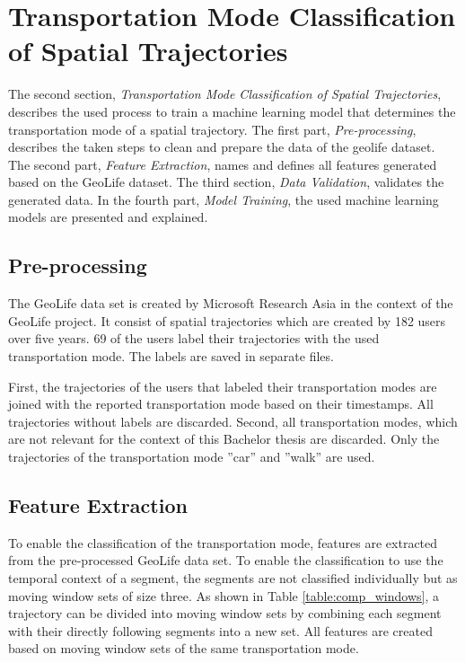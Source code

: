 \section{Transportation Mode Classification of Spatial Trajectories}
The second section, \textit{Transportation Mode Classification of Spatial Trajectories}, describes the used process to train a machine learning model that determines the transportation mode of a spatial trajectory.
The first part, \textit{Pre-processing}, describes the taken steps to clean and prepare the data of the geolife dataset.
The second part, \textit{Feature Extraction}, names and defines all features generated based on the GeoLife dataset.
The third section, \textit{Data Validation}, validates the generated data.
In the fourth part, \textit{Model Training}, the used machine learning models are presented and explained. 

\subsection{Pre-processing}

The GeoLife data set is created by Microsoft Research Asia in the context of the GeoLife project. It consist of spatial trajectories which are created by 182 users over five years. 69 of the users label their trajectories with the used transportation mode. The labels are saved in separate files. \cite{zheng2008understanding} \cite{zheng2010geolife} \cite{geolife-dataset} \cite{zheng2009mining}

First, the trajectories of the users that labeled their transportation modes are joined with the reported transportation mode based on their timestamps. All trajectories without labels are discarded. Second, all transportation modes, which are not relevant for the context of this Bachelor thesis are discarded. Only the trajectories of the transportation mode ''car'' and ''walk'' are used.

\subsection{Feature Extraction}

To enable the classification of the transportation mode, features are extracted from the pre-processed GeoLife data set. To enable the classification to use the temporal context of a segment, the segments are not classified individually but as moving window sets of size three. As shown in Table \ref{table:comp_windows}, a trajectory can be divided into moving window sets by combining each segment with their directly following segments into a new set. All features are created based on moving window sets of the same transportation mode. \cite{Bolbol2012}

